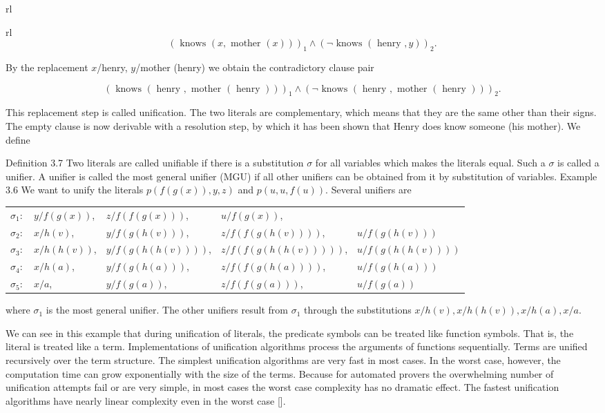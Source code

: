 \documentclass[10pt]{book}
\begin{document}
\begin{center}
\begin{tabular}{rl}
\begin{tabular}{rl}
$$
(\text { knows }(x, \text { mother }(x)))_{1} \wedge(\neg \text { knows }(\text { henry }, y))_{2} .
$$

By the replacement $x$/henry, $y$/mother (henry) we obtain the contradictory clause pair

$$
(\text { knows }(\text { henry }, \text { mother }(\text { henry })))_{1} \wedge(\neg \text { knows }(\text { henry }, \text { mother }(\text { henry })))_{2} .
$$

This replacement step is called unification. The two literals are complementary, which means that they are the same other than their signs. The empty clause is now derivable with a resolution step, by which it has been shown that Henry does know someone (his mother). We define

Definition 3.7 Two literals are called unifiable if there is a substitution $\sigma$ for all variables which makes the literals equal. Such a $\sigma$ is called a unifier. A unifier is called the most general unifier (MGU) if all other unifiers can be obtained from it by substitution of variables.
Example 3.6 We want to unify the literals $p(f(g(x)), y, z)$ and $p(u, u, f(u))$. Several unifiers are

\begin{center}
\begin{tabular}{lllll}
$\sigma_{1}:$ & $y / f(g(x))$, & $z / f(f(g(x)))$, & $u / f(g(x))$, &  \\
$\sigma_{2}:$ & $x / h(v)$, & $y / f(g(h(v)))$, & $z / f(f(g(h(v))))$, & $u / f(g(h(v)))$ \\
$\sigma_{3}:$ & $x / h(h(v))$, & $y / f(g(h(h(v))))$, & $z / f(f(g(h(h(v)))))$, & $u / f(g(h(h(v))))$ \\
$\sigma_{4}:$ & $x / h(a)$, & $y / f(g(h(a)))$, & $z / f(f(g(h(a))))$, & $u / f(g(h(a)))$ \\
$\sigma_{5}:$ & $x / a$, & $y / f(g(a))$, & $z / f(f(g(a)))$, & $u / f(g(a))$ \\
\end{tabular}
\end{center}

where $\sigma_{1}$ is the most general unifier. The other unifiers result from $\sigma_{1}$ through the substitutions $x / h(v), x / h(h(v)), x / h(a), x / a$.

We can see in this example that during unification of literals, the predicate symbols can be treated like function symbols. That is, the literal is treated like a term. Implementations of unification algorithms process the arguments of functions sequentially. Terms are unified recursively over the term structure. The simplest unification algorithms are very fast in most cases. In the worst case, however, the computation time can grow exponentially with the size of the terms. Because for automated provers the overwhelming number of unification attempts fail or are very simple, in most cases the worst case complexity has no dramatic effect. The fastest unification algorithms have nearly linear complexity even in the worst case [\cite{bibel1982automated}].


\end{tabular}
\end{tabular}
\end{center}
\end{document}
